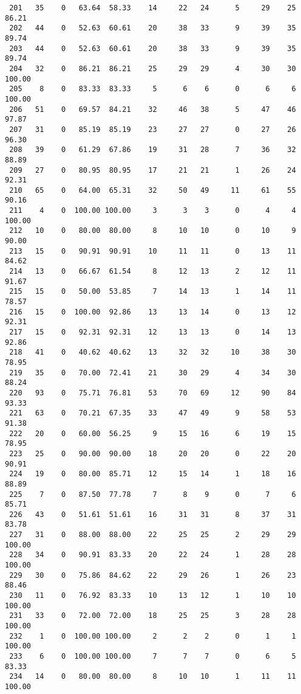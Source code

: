 \begin{verbatim}
 201   35    0   63.64  58.33    14     22   24      5     29    25    86.21
 202   44    0   52.63  60.61    20     38   33      9     39    35    89.74
 203   44    0   52.63  60.61    20     38   33      9     39    35    89.74
 204   32    0   86.21  86.21    25     29   29      4     30    30   100.00
 205    8    0   83.33  83.33     5      6    6      0      6     6   100.00
 206   51    0   69.57  84.21    32     46   38      5     47    46    97.87
 207   31    0   85.19  85.19    23     27   27      0     27    26    96.30
 208   39    0   61.29  67.86    19     31   28      7     36    32    88.89
 209   27    0   80.95  80.95    17     21   21      1     26    24    92.31
 210   65    0   64.00  65.31    32     50   49     11     61    55    90.16
 211    4    0  100.00 100.00     3      3    3      0      4     4   100.00
 212   10    0   80.00  80.00     8     10   10      0     10     9    90.00
 213   15    0   90.91  90.91    10     11   11      0     13    11    84.62
 214   13    0   66.67  61.54     8     12   13      2     12    11    91.67
 215   15    0   50.00  53.85     7     14   13      1     14    11    78.57
 216   15    0  100.00  92.86    13     13   14      0     13    12    92.31
 217   15    0   92.31  92.31    12     13   13      0     14    13    92.86
 218   41    0   40.62  40.62    13     32   32     10     38    30    78.95
 219   35    0   70.00  72.41    21     30   29      4     34    30    88.24
 220   93    0   75.71  76.81    53     70   69     12     90    84    93.33
 221   63    0   70.21  67.35    33     47   49      9     58    53    91.38
 222   20    0   60.00  56.25     9     15   16      6     19    15    78.95
 223   25    0   90.00  90.00    18     20   20      0     22    20    90.91
 224   19    0   80.00  85.71    12     15   14      1     18    16    88.89
 225    7    0   87.50  77.78     7      8    9      0      7     6    85.71
 226   43    0   51.61  51.61    16     31   31      8     37    31    83.78
 227   31    0   88.00  88.00    22     25   25      2     29    29   100.00
 228   34    0   90.91  83.33    20     22   24      1     28    28   100.00
 229   30    0   75.86  84.62    22     29   26      1     26    23    88.46
 230   11    0   76.92  83.33    10     13   12      1     10    10   100.00
 231   33    0   72.00  72.00    18     25   25      3     28    28   100.00
 232    1    0  100.00 100.00     2      2    2      0      1     1   100.00
 233    6    0  100.00 100.00     7      7    7      0      6     5    83.33
 234   14    0   80.00  80.00     8     10   10      1     11    11   100.00

\end{verbatim}
